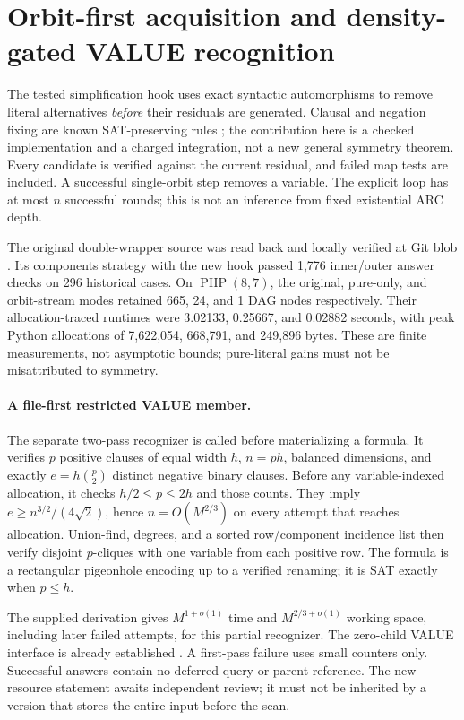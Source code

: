 \section{Orbit-first acquisition and density-gated VALUE recognition}
The tested simplification hook uses exact syntactic automorphisms to remove
literal alternatives \emph{before} their residuals are generated. Clausal and
negation fixing are known SAT-preserving rules
\cite[Theorems~3.2--3.3]{arc0005Orbitopal}; the contribution here is a checked
implementation and a charged integration, not a new general symmetry theorem.
Every candidate is verified against the current residual, and failed map tests
are included. A successful single-orbit step removes a variable. The explicit
loop has at most $n$ successful rounds; this is not an inference from fixed
existential ARC depth.

The original double-wrapper source was read back and locally verified at Git
blob . Its components strategy
with the new hook passed 1,776 inner/outer answer checks on 296 historical
cases. On $\operatorname{PHP}(8,7)$, the original, pure-only, and orbit-stream
modes retained 665, 24, and 1 DAG nodes respectively. Their allocation-traced
runtimes were 3.02133, 0.25667, and 0.02882 seconds, with peak Python allocations
of 7,622,054, 668,791, and 249,896 bytes. These are finite measurements, not
asymptotic bounds; pure-literal gains must not be misattributed to symmetry.

\paragraph{A file-first restricted VALUE member.}
The separate two-pass recognizer is called before materializing a formula.
It verifies $p$ positive clauses of equal width $h$, $n=ph$, balanced dimensions,
and exactly $e=h\binom p2$ distinct negative binary clauses. Before any
variable-indexed allocation, it checks $h/2\le p\le2h$ and those counts.
They imply $e\ge n^{3/2}/(4\sqrt2)$, hence $n=O(M^{2/3})$ on every attempt
that reaches allocation. Union-find, degrees, and a sorted row/component
incidence list then verify disjoint $p$-cliques with one variable from each
positive row. The formula is a rectangular pigeonhole encoding up to a
verified renaming; it is SAT exactly when $p\le h$.

The supplied derivation gives $M^{1+o(1)}$ time and $M^{2/3+o(1)}$ working
space, including later failed attempts, for this partial recognizer. The
zero-child VALUE interface is already established
\cite{arc0005Write002}. A first-pass failure uses small counters only. Successful
answers contain no deferred query or parent reference. The new resource
statement awaits independent review; it must not be inherited by a version
that stores the entire input before the scan.

